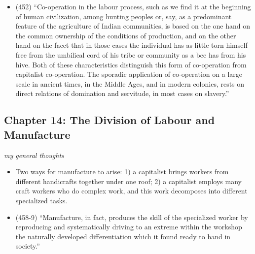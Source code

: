 \documentclass[a4paper,12pt]{article}
\begin{document}
\begin{itemize}
\item
(452) ``Co-operation in the labour process, such as we find it at the beginning of human civilization, among hunting peoples or, say, as a predominant feature of the agriculture of Indian communities, is based on the one hand on the common ownership of the conditions of production, and on the other hand on the facct that in those cases the individual has as little torn himself free from the umbilical cord of his tribe or community as a bee has from his hive. Both of these characteristics distinguish this form of co-operation from capitalist co-operation. The sporadic application of co-operation on a large scale in ancient times, in the Middle Ages, and in modern colonies, rests on direct relations of domination and servitude, in most cases on slavery.''

\end{itemize}

\subsection{Chapter 14: The Division of Labour and Manufacture}

\textit{my general thoughts}
\begin{itemize}
\item
Two ways for manufacture to arise: 1) a capitalist brings workers from different handicrafts together under one roof; 2) a capitalist employs many craft workers who do complex work, and this work decomposes into different specialized tasks.

\item
(458-9) ``Manufacture, in fact, produces the skill of the specialized worker by reproducing and systematically driving to an extreme within the workshop the naturally developed differentiation which it found ready to hand in society.''
\end{itemize}
\end{document}
